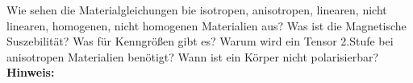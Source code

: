\begin{question}[section=2,subsection=22,name={Einfache Materialgleichungen},difficulty=3,type=mdl,mode=exm,tags={}]
	Wie sehen die Materialgleichungen bie isotropen, anisotropen, linearen, nicht linearen, homogenen, nicht homogenen Materialien aus? Was ist die Magnetische Suszebilität? Was für Kenngrößen gibt es? Warum wird ein Tensor 2.Stufe bei anisotropen Materialien benötigt? Wann ist ein Körper nicht polarisierbar?
	\\ \textbf{Hinweis:}\\
	
\end{question}
\begin{solution}
	
\end{solution}
